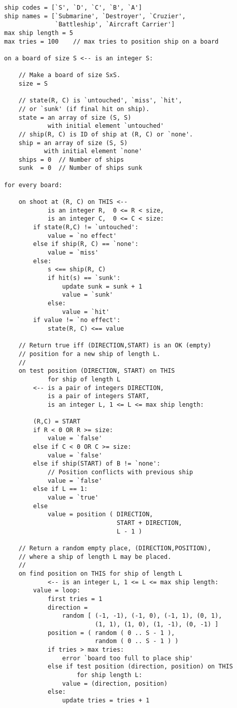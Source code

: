 \documentclass[12pt]{article}
\begin{document}
\begin{verbatim}
ship codes = [`S', `D', `C', `B', `A']
ship names = [`Submarine', `Destroyer', `Cruzier',
              `Battleship', `Aircraft Carrier']
max ship length = 5
max tries = 100    // max tries to position ship on a board

on a board of size S <-- is an integer S:

    // Make a board of size SxS.
    size = S

    // state(R, C) is `untouched', `miss', `hit',
    // or `sunk' (if final hit on ship).
    state = an array of size (S, S)
            with initial element `untouched'
    // ship(R, C) is ID of ship at (R, C) or `none'.
    ship = an array of size (S, S)
           with initial element `none'
    ships = 0  // Number of ships
    sunk  = 0  // Number of ships sunk

for every board:

    on shoot at (R, C) on THIS <--
            is an integer R,  0 <= R < size,
            is an integer C,  0 <= C < size:
        if state(R,C) != `untouched':
            value = `no effect'
        else if ship(R, C) == `none':
            value = `miss'
        else:
            s <== ship(R, C)
            if hit(s) == `sunk':
                update sunk = sunk + 1
                value = `sunk'
            else:
                value = `hit'
        if value != `no effect':
            state(R, C) <== value

    // Return true iff (DIRECTION,START) is an OK (empty)
    // position for a new ship of length L.
    //
    on test position (DIRECTION, START) on THIS
            for ship of length L
        <-- is a pair of integers DIRECTION,
            is a pair of integers START,
            is an integer L, 1 <= L <= max ship length:

        (R,C) = START
        if R < 0 OR R >= size:
            value = `false'
        else if C < 0 OR C >= size:
            value = `false'
        else if ship(START) of B != `none':
            // Position conflicts with previous ship
            value = `false'
        else if L == 1:
            value = `true'
        else
            value = position ( DIRECTION,
                               START + DIRECTION,
                               L - 1 )

    // Return a random empty place, (DIRECTION,POSITION),
    // where a ship of length L may be placed.
    //
    on find position on THIS for ship of length L
            <-- is an integer L, 1 <= L <= max ship length:
        value = loop:
            first tries = 1
            direction =
                random [ (-1, -1), (-1, 0), (-1, 1), (0, 1),
                         (1, 1), (1, 0), (1, -1), (0, -1) ]
            position = ( random ( 0 .. S - 1 ),
                         random ( 0 .. S - 1 ) )
            if tries > max tries:
                error `board too full to place ship'
            else if test position (direction, position) on THIS
                    for ship length L:
                value = (direction, position)
            else:
                update tries = tries + 1


\end{verbatim}
\end{document}
